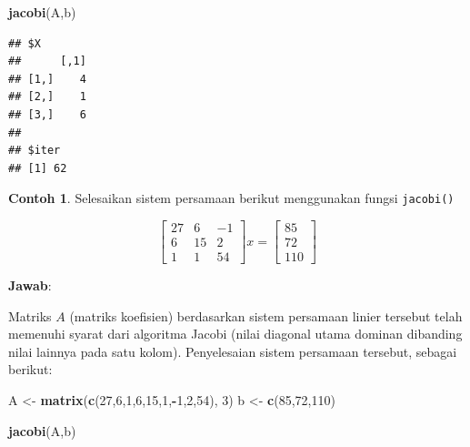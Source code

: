\documentclass[
]{book}
\newenvironment{Shaded}{\begin{snugshade}}{\end{snugshade}}
\newcommand{\DecValTok}[1]{\textcolor[rgb]{0.00,0.00,0.81}{#1}}
\newcommand{\FunctionTok}[1]{\textcolor[rgb]{0.13,0.29,0.53}{\textbf{#1}}}
\newcommand{\NormalTok}[1]{#1}
\newcommand{\OtherTok}[1]{\textcolor[rgb]{0.56,0.35,0.01}{#1}}
\newcommand{\SpecialCharTok}[1]{\textcolor[rgb]{0.81,0.36,0.00}{\textbf{#1}}}
\theoremstyle{definition}
\theoremstyle{definition}
\newtheorem{example}{Contoh}[chapter]
\theoremstyle{definition}
\theoremstyle{definition}
\theoremstyle{remark}
\begin{document}
\begin{Shaded}
\begin{Highlighting}[]
\FunctionTok{jacobi}\NormalTok{(A,b)}
\end{Highlighting}
\end{Shaded}

\begin{verbatim}
## $X
##      [,1]
## [1,]    4
## [2,]    1
## [3,]    6
## 
## $iter
## [1] 62
\end{verbatim}

\begin{example}
\protect\hypertarget{exm:jacobiexm2}{}\label{exm:jacobiexm2}Selesaikan sistem persamaan berikut menggunakan fungsi \texttt{jacobi()}
\end{example}

\[
\begin{bmatrix}
     27 & 6 & -1     \\[0.3em]
     6 & 15 & 2     \\[0.3em]
     1 & 1 & 54
\end{bmatrix}
x = \begin{bmatrix}
     85     \\[0.3em]
     72     \\[0.3em]
     110
\end{bmatrix}
\]

\textbf{Jawab}:

Matriks \(A\) (matriks koefisien) berdasarkan sistem persamaan linier tersebut telah memenuhi syarat dari algoritma Jacobi (nilai diagonal utama dominan dibanding nilai lainnya pada satu kolom). Penyelesaian sistem persamaan tersebut, sebagai berikut:

\begin{Shaded}
\begin{Highlighting}[]
\NormalTok{A }\OtherTok{\textless{}{-}} \FunctionTok{matrix}\NormalTok{(}\FunctionTok{c}\NormalTok{(}\DecValTok{27}\NormalTok{,}\DecValTok{6}\NormalTok{,}\DecValTok{1}\NormalTok{,}\DecValTok{6}\NormalTok{,}\DecValTok{15}\NormalTok{,}\DecValTok{1}\NormalTok{,}\SpecialCharTok{{-}}\DecValTok{1}\NormalTok{,}\DecValTok{2}\NormalTok{,}\DecValTok{54}\NormalTok{), }\DecValTok{3}\NormalTok{)}
\NormalTok{b }\OtherTok{\textless{}{-}} \FunctionTok{c}\NormalTok{(}\DecValTok{85}\NormalTok{,}\DecValTok{72}\NormalTok{,}\DecValTok{110}\NormalTok{)}

\FunctionTok{jacobi}\NormalTok{(A,b)}
\end{Highlighting}
\end{Shaded}
\end{document}
